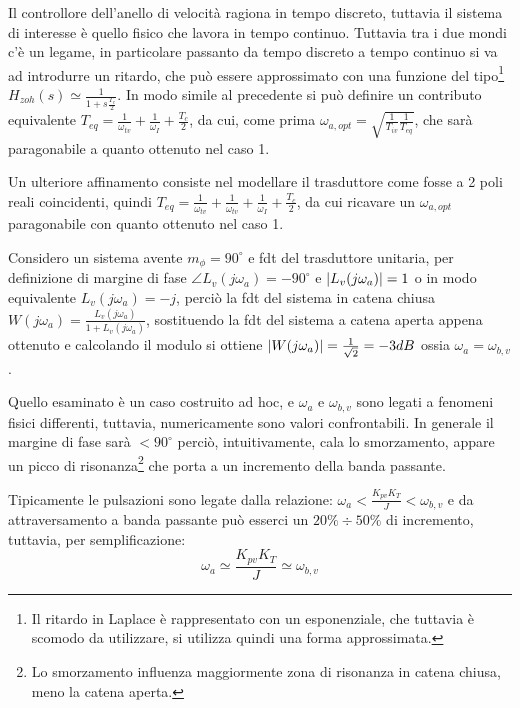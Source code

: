 Il controllore dell'anello di velocità ragiona in tempo discreto, tuttavia il sistema di interesse è quello fisico che lavora in tempo continuo. Tuttavia tra i due mondi c'è un legame, in particolare passanto da tempo discreto a tempo continuo si va ad introdurre un ritardo, che può essere approssimato con una funzione del tipo\footnote{Il ritardo in Laplace è rappresentato con un esponenziale, che tuttavia è scomodo da utilizzare, si utilizza quindi una forma approssimata.} \(H_{zoh}(s) \simeq \frac{1}{1+s\frac{T_c}{2}}\). In modo simile al precedente si può definire un contributo equivalente \(T_{eq}=\frac{1}{\omega_{tv}}+\frac{1}{\omega_I}+\frac{T_c}{2}\), da cui, come prima \(\omega_{a,opt} = \sqrt{\frac{1}{T_{iv}}\frac{1}{T_{eq}}}\), che sarà paragonabile a quanto ottenuto nel caso 1.

Un ulteriore affinamento consiste nel modellare il trasduttore come fosse a 2 poli reali coincidenti, quindi \(T_{eq}=\frac{1}{\omega_{tv}}+\frac{1}{\omega_{tv}}+\frac{1}{\omega_I}+\frac{T_c}{2}\), da cui ricavare un \(\omega_{a,opt}\) paragonabile con quanto ottenuto nel caso 1.

Considero un sistema avente \(m_\phi=90^\circ\) e fdt del trasduttore unitaria, per definizione di margine di fase \(\angle{L_v(j\omega_a)} = -90^\circ\) e \(\left|L_v(j\omega_a)\right|=1\) o in modo equivalente \(L_v(j\omega_a)=-j\), perciò la fdt del sistema in catena chiusa \(W(j\omega_a)=\frac{L_v(j\omega_a)}{1+L_v(j\omega_a)}\), sostituendo la fdt del sistema a catena aperta appena ottenuto e calcolando il modulo si ottiene \(\left|W(j\omega_a)\right|=\frac{1}{\sqrt{2}}=-3dB\) ossia \(\omega_a=\omega_{b,v}\).

Quello esaminato è un caso costruito ad hoc, e \(\omega_a\) e \(\omega_{b,v}\) sono legati a fenomeni fisici differenti, tuttavia, numericamente sono valori confrontabili.
In generale il margine di fase sarà \(<90^\circ\) perciò, intuitivamente, cala lo smorzamento, appare un picco di risonanza\footnote{Lo smorzamento influenza maggiormente zona di risonanza in catena chiusa, meno la catena aperta.} che porta a un incremento della banda passante.

Tipicamente le pulsazioni sono legate dalla relazione: \(\omega_a < \frac{K_{pv}K_T}{J} < \omega_{b,v}\) e da attraversamento a banda passante può esserci un \(20\% \div 50\%\) di incremento, tuttavia, per semplificazione:
\[\omega_a \simeq \frac{K_{pv}K_T}{J} \simeq \omega_{b,v}\]

